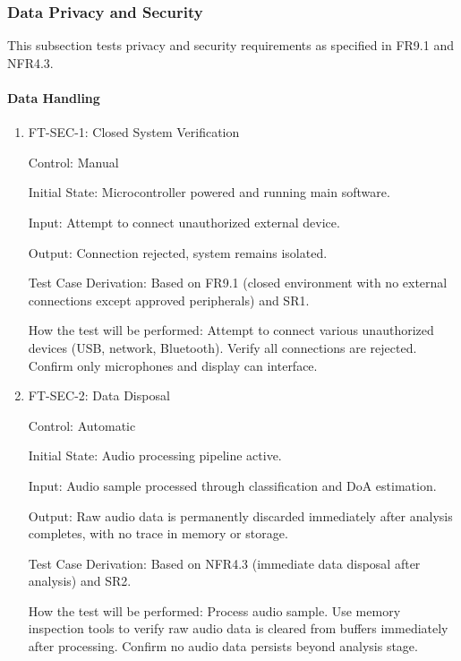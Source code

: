 \documentclass[12pt, titlepage]{article}
\begin{document}
\subsubsection{Data Privacy and Security}

This subsection tests privacy and security requirements as specified in FR9.1
and NFR4.3.

\paragraph{Data Handling}

\begin{enumerate}

\item{FT-SEC-1: Closed System Verification\\}

Control: Manual
					
Initial State: Microcontroller powered and running main software.
					
Input: Attempt to connect unauthorized external device.
					
Output: Connection rejected, system remains isolated.

Test Case Derivation: Based on FR9.1 (closed environment with no external
connections except approved peripherals) and SR1.

How the test will be performed: Attempt to connect various unauthorized devices
(USB, network, Bluetooth). Verify all connections are rejected. Confirm only
microphones and display can interface.

\item{FT-SEC-2: Data Disposal\\}

Control: Automatic
					
Initial State: Audio processing pipeline active.
					
Input: Audio sample processed through classification and DoA estimation.
					
Output: Raw audio data is permanently discarded immediately after analysis
completes, with no trace in memory or storage.

Test Case Derivation: Based on NFR4.3 (immediate data disposal after analysis)
and SR2.

How the test will be performed: Process audio sample. Use memory inspection tools to
verify raw audio data is cleared from buffers immediately after processing.
Confirm no audio data persists beyond analysis stage.

\end{enumerate}
\end{document}
